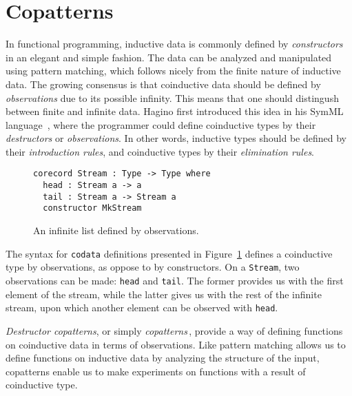 

\section{Copatterns}
\label{sec:copatterns}
In functional programming, inductive data is commonly defined by \emph{constructors} in an
elegant and simple fashion. The data can be analyzed and manipulated using
pattern matching, which follows nicely from the finite nature of inductive
data. The growing consensus is that coinductive data should be defined by
\emph{observations} due to its possible infinity. This means that one should distingush
between finite and infinite data. Hagino first introduced this idea in his SymML
language \,\citep{Hagino89}, where the programmer could define coinductive types
by their \emph{destructors} or \emph{observations}. In other words, inductive
types should be defined by their \emph{introduction rules}, and coinductive types by
their \emph{elimination rules}.

\begin{figure}[h]
\begin{lstlisting}[mathescape]
corecord Stream : Type -> Type where
  head : Stream a -> a
  tail : Stream a -> Stream a 
  constructor MkStream
\end{lstlisting}
\caption{An infinite list defined by observations.}
\label{fig:stream}
\end{figure}

The syntax for \texttt{codata} definitions presented in
Figure~\ref{fig:stream} defines a coinductive type by observations, as oppose to
by constructors. On a \texttt{Stream}, two observations can be made:
\texttt{head} and \texttt{tail}. The former provides us with the first element
of the stream, while the latter gives us with the rest of the infinite stream,
upon which another element can be observed with \texttt{head}. 

\emph{Destructor copatterns}, or simply
\emph{copatterns}\,\citep{Abel13Copatterns}, provide a way of defining functions
on coinductive data in terms of observations. Like pattern matching allows us to
define functions on inductive data by analyzing the structure of the input,
copatterns enable us to make experiments on functions with a result of
coinductive type.

